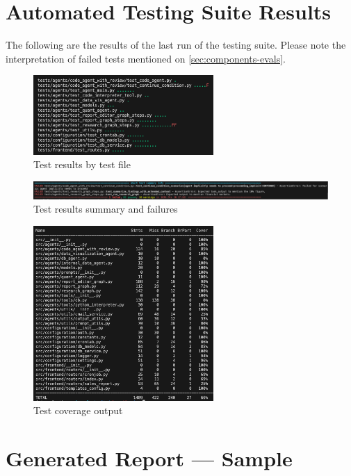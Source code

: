 \documentclass[a4paper]{report}
\begin{document}
\chapter{Automated Testing Suite Results}
\label{annex:test-results}

The following are the results of the last run of the testing suite. Please note the interpretation of failed tests mentioned on \autoref{sec:components-evals}.

\begin{figure}[H]
\centering
\includegraphics[width=0.61\textwidth]{images/test-results.png}
\caption{Test results by test file}
\end{figure}

\begin{figure}[H]
\centering
\includegraphics[width=1\textwidth]{images/test-results-bottom.png}
\caption{Test results summary and failures}
\label{fig:evals-form}
\end{figure}

\begin{figure}[H]
\centering
\includegraphics[width=0.61\textwidth]{images/test-coverage.png}
\caption{Test coverage output}
\label{fig:evals-form}
\end{figure}

\chapter{Generated Report --- Sample}
\end{document}
